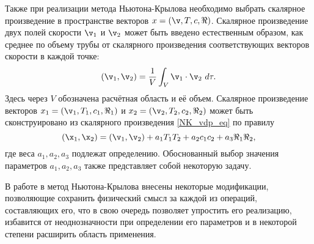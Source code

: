 Также при реализации метода Ньютона-Крылова необходимо выбрать скалярное произведение в пространстве векторов $x = (\v, T, c, \Re)$. Скалярное произведение двух полей скорости $\v_1$ и $\v_2$ может быть введено естественным образом, как среднее по объему трубы от скалярного произведения соответствующих векторов скорости в каждой точке:
\begin{equation} \label{NK_vdp_eq}
(\v_1, \v_2) =  \frac{1}{V} \int_{V} \v_1 \cdot \v_2 \ d\tau .
\end{equation}
Здесь через $V$ обозначена расчётная область и её объем. Скалярное произведение векторов $x_1 = (\v_1, T_1, c_1, \Re_1)$ и $x_2 = (\v_2, T_2, c_2, \Re_2)$ может быть сконструировано из скалярного произведения \eqref{NK_vdp_eq} по правилу
\begin{equation}
(\x_1, \x_2) = (\v_1, \v_2) + a_1 T_1 T_2 + a_2 c_1 c_2 + a_3 \Re_1 \Re_2,
\end{equation} 
где веса $a_1, a_2, a_3$ подлежат определению. Обоснованный выбор значения параметров $a_1, a_2, a_3$ также представляет собой некоторую задачу. 

В работе в метод Ньютона-Крылова внесены некоторые модификации, позволяющие сохранить физический смысл за каждой из операций, составляющих его, что в свою очередь позволяет упростить его реализацию, избавится от неоднозначности при определении его параметров и в некоторой степени расширить область применения. 

